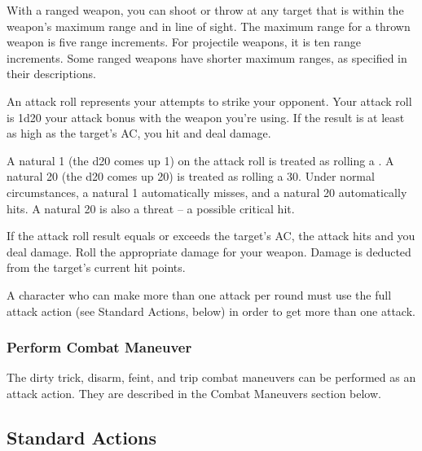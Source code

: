 With a ranged weapon, you can shoot or throw at any target that is within the weapon's maximum range and in line of sight. The maximum range for a thrown weapon is five range increments. For projectile weapons, it is ten range increments. Some ranged weapons have shorter maximum ranges, as specified in their descriptions.

 An attack roll represents your attempts to strike your opponent.
Your attack roll is 1d20 \add your attack bonus with the weapon you're using. If the result is at least as high as the target's AC, you hit and deal damage.

 A natural 1 (the d20 comes up 1) on the attack roll is treated as rolling a . A natural 20 (the d20 comes up 20) is treated as rolling a 30. Under normal circumstances, a natural 1 automatically misses, and a natural 20 automatically hits. A natural 20 is also a threat -- a possible critical hit.

 If the attack roll result equals or exceeds the target's AC, the attack hits and you deal damage. Roll the appropriate damage for your weapon. Damage is deducted from the target's current hit points.

 A character who can make more than one attack per round must use the full attack action (see Standard Actions, below) in order to get more than one attack.

\subsubsection{Perform Combat Maneuver}
The dirty trick, disarm, feint, and trip combat maneuvers can be performed as an attack action. They are described in the Combat Maneuvers section below.

\subsection{Standard Actions}

